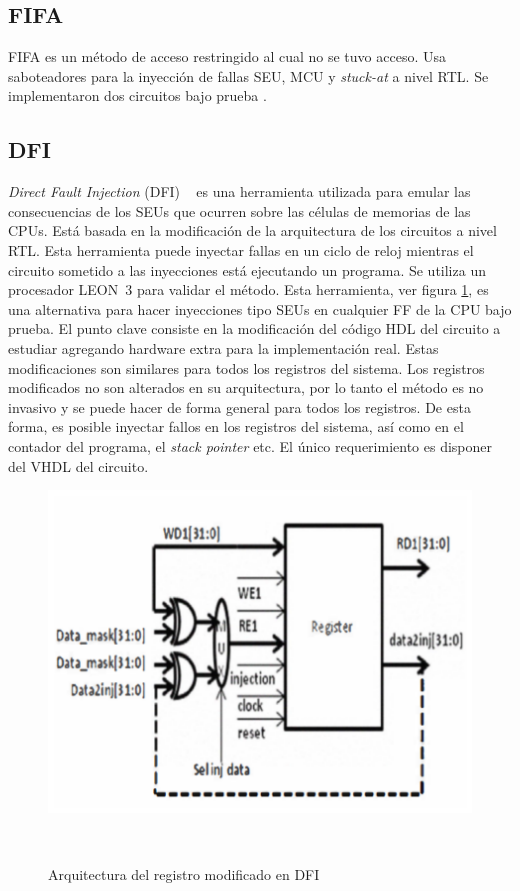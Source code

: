 \documentclass[a4paper,openright,12pt]{report}
\begin{document}
\subsection{FIFA}
FIFA
\cite{naviner2011fifa} es un método  de acceso restringido al cual no se tuvo acceso.  Usa saboteadores para la inyección de fallas SEU, MCU y \textit{stuck-at} a nivel RTL. Se implementaron dos circuitos bajo prueba .


\subsection{DFI}
\textit{Direct Fault Injection} (DFI) ~\cite{6261258}  es una herramienta  utilizada para emular las consecuencias de los SEUs que ocurren sobre las células de memorias de las CPUs. Está basada en la modificación de la arquitectura de los circuitos a nivel RTL. Esta herramienta puede inyectar fallas en un ciclo de reloj mientras el circuito sometido a las inyecciones está ejecutando un programa.
Se utiliza un procesador \mbox{LEON }3 para validar el método.
Esta herramienta, ver figura \ref{DFI}, es una alternativa para hacer inyecciones tipo SEUs en cualquier FF de la CPU bajo prueba. El punto clave  consiste en la modificación del código HDL del circuito a estudiar agregando hardware extra para la implementación real. Estas modificaciones son similares para todos los registros del sistema. Los registros modificados no son alterados en su arquitectura, por lo tanto el método es no invasivo y se puede hacer de forma general para todos los registros. De esta forma, es posible inyectar fallos en los registros del sistema, así  como en el contador del programa, el \textit{stack pointer} etc. El único requerimiento es  disponer del VHDL del circuito.



\begin{figure}[H]
	\centering
	\includegraphics[width=0.45 \textwidth]{img/DFI.pdf}
	\caption{Arquitectura del registro modificado en DFI}
     ~\cite{6131392}
	\label{DFI}
\end{figure}
\end{document}

